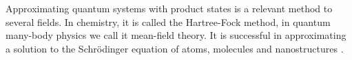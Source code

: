 Approximating quantum systems with product states is a relevant method to several fields.
In chemistry, it is called the Hartree-Fock method, in quantum many-body physics we call it mean-field theory.
It is successful in approximating a solution to the Schrödinger equation of atoms, molecules and nanostructures \cite{abdulsattar12}.
